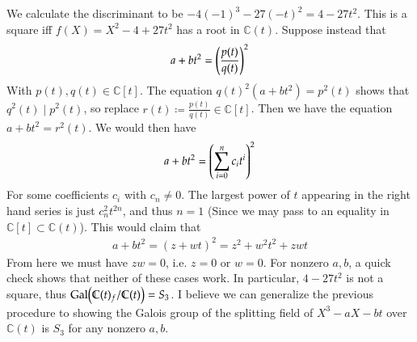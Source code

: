 \documentclass[12pt]{article}
\theoremstyle{definitionstyle}
\def\mbb#1{\mathbb{#1}}
\def \C{\mbb{C}}
\newcommand{\Gal}{\mathrm{Gal}\qty}
\begin{document}
\begin{enumerate}[label=(\arabic*)]
			We calculate the discriminant to be $-4(-1)^3 - 27(-t)^2 = 4 - 27t^2$. This is a square iff $f(X) = X^2 - 4 + 27t^2$ has a root in $\C(t)$. Suppose instead that
			\begin{align*}
				a+bt^2 = \qty(\frac{p(t)}{q(t)})^2
			\end{align*}
			With $p(t), q(t) \in \C[t]$. The equation $q(t)^2(a+bt^2) = p^2(t)$ shows that $q^2(t) \mid p^2(t)$, so replace $r(t) \coloneqq \frac{p(t)}{q(t)} \in \C[t]$. Then we have the equation $a+bt^2 = r^2(t)$. We would then have
			\begin{align*}
				a+bt^2 = \qty(\sum_{i=0}^n c_it^i)^2
			\end{align*}
			For some coefficients $c_i$ with $c_n \neq 0$. The largest power of $t$ appearing in the right hand series is just $c_n^2t^{2n}$, and thus $n = 1$ (Since we may pass to an equality in $\C[t] \subset \C(t)$). This would claim that
			\begin{align*}
				a+bt^2 = (z+wt)^2 = z^2 + w^2t^2 + zwt
			\end{align*}
			From here we must have $zw = 0$, i.e. $z = 0$ or $w = 0$. For nonzero $a, b$, a quick check shows that neither of these cases work. In particular, $4-27t^2$ is not a square, thus $\Gal(\C(t)_f/\C(t)) = S_3$. I believe we can generalize the previous procedure to showing the Galois group of the splitting field of $X^3 - aX - bt$ over $\C(t)$ is $S_3$ for any nonzero $a,b$.
		\end{enumerate}
\end{document}
